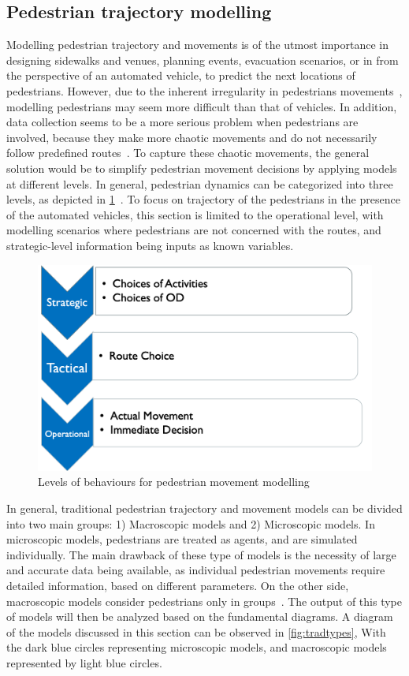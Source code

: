 \subsection{Pedestrian trajectory modelling}
Modelling pedestrian trajectory and movements is of the utmost importance in designing sidewalks and venues, planning events, evacuation scenarios, or in from the perspective of an automated vehicle, to predict the next locations of pedestrians. However, due to the inherent irregularity in pedestrians movements~\cite{bierlaire2003behavioral}, modelling pedestrians may seem more difficult than that of vehicles. In addition, data collection seems to be a more serious problem when pedestrians are involved, because they make more chaotic movements and do not necessarily follow predefined routes~\cite{danalet2014bayesian}. To capture these chaotic movements, the general solution would be to simplify pedestrian movement decisions by applying models at different levels. In general, pedestrian dynamics can be categorized into three levels, as depicted in \cref{fig:model levels}~\cite{sahaleh2012scenario}. To focus on trajectory of the pedestrians in the presence of the automated vehicles, this section is limited to the operational level, with modelling scenarios where pedestrians are not concerned with the routes, and strategic-level information being inputs as known variables.
\begin{figure}
    \centering
    \includegraphics[scale=0.6]{chapter_1b/figures/ped-levels.png}
    \caption{Levels of behaviours for pedestrian movement modelling}
    \label{fig:model levels}
\end{figure}
In general, traditional pedestrian trajectory and movement models can be divided into two main groups: 1) Macroscopic models and 2) Microscopic models. In microscopic models, pedestrians are treated as agents, and are simulated individually. The main drawback of these type of models is the necessity of large and accurate data being available, as individual pedestrian movements require detailed information, based on different parameters. On the other side, macroscopic models consider pedestrians only in groups~\cite{sahaleh2012scenario}. The output of this type of models will then be analyzed based on the fundamental diagrams. A diagram of the models discussed in this section can be observed in \cref{fig:tradtypes}, With the dark blue circles representing microscopic models, and macroscopic models represented by light blue circles.
